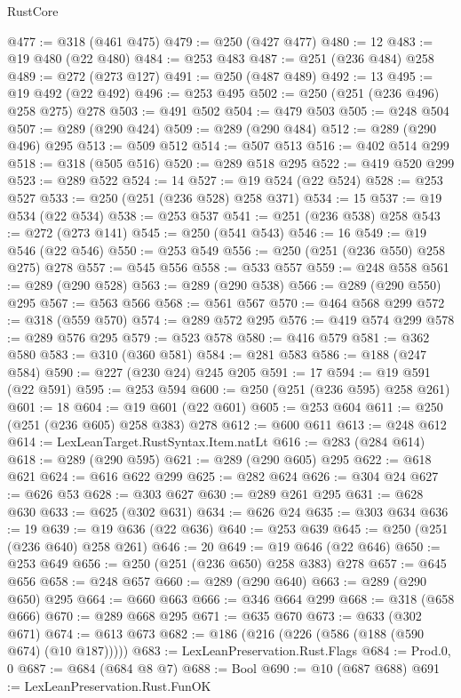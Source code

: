 \begin{lexlean}{RustCore}
\begin{coremodule}
@477 := @318 (@461 @475)
@479 := @250 (@427 @477)
@480 := 12
@483 := @19 @480 (@22 @480)
@484 := @253 @483
@487 := @251 (@236 @484) @258
@489 := @272 (@273 @127)
@491 := @250 (@487 @489)
@492 := 13
@495 := @19 @492 (@22 @492)
@496 := @253 @495
@502 := @250 (@251 (@236 @496) @258 @275) @278
@503 := @491 @502
@504 := @479 @503
@505 := @248 @504
@507 := @289 (@290 @424)
@509 := @289 (@290 @484)
@512 := @289 (@290 @496) @295
@513 := @509 @512
@514 := @507 @513
@516 := @402 @514 @299
@518 := @318 (@505 @516)
@520 := @289 @518 @295
@522 := @419 @520 @299
@523 := @289 @522
@524 := 14
@527 := @19 @524 (@22 @524)
@528 := @253 @527
@533 := @250 (@251 (@236 @528) @258 @371)
@534 := 15
@537 := @19 @534 (@22 @534)
@538 := @253 @537
@541 := @251 (@236 @538) @258
@543 := @272 (@273 @141)
@545 := @250 (@541 @543)
@546 := 16
@549 := @19 @546 (@22 @546)
@550 := @253 @549
@556 := @250 (@251 (@236 @550) @258 @275) @278
@557 := @545 @556
@558 := @533 @557
@559 := @248 @558
@561 := @289 (@290 @528)
@563 := @289 (@290 @538)
@566 := @289 (@290 @550) @295
@567 := @563 @566
@568 := @561 @567
@570 := @464 @568 @299
@572 := @318 (@559 @570)
@574 := @289 @572 @295
@576 := @419 @574 @299
@578 := @289 @576 @295
@579 := @523 @578
@580 := @416 @579
@581 := @362 @580
@583 := @310 (@360 @581)
@584 := @281 @583
@586 := @188 (@247 @584)
@590 := @227 (@230 @24) @245 @205
@591 := 17
@594 := @19 @591 (@22 @591)
@595 := @253 @594
@600 := @250 (@251 (@236 @595) @258 @261)
@601 := 18
@604 := @19 @601 (@22 @601)
@605 := @253 @604
@611 := @250 (@251 (@236 @605) @258 @383) @278
@612 := @600 @611
@613 := @248 @612
@614 := LexLeanTarget.RustSyntax.Item.natLt
@616 := @283 (@284 @614)
@618 := @289 (@290 @595)
@621 := @289 (@290 @605) @295
@622 := @618 @621
@624 := @616 @622 @299
@625 := @282 @624
@626 := @304 @24
@627 := @626 @53
@628 := @303 @627
@630 := @289 @261 @295
@631 := @628 @630
@633 := @625 (@302 @631)
@634 := @626 @24
@635 := @303 @634
@636 := 19
@639 := @19 @636 (@22 @636)
@640 := @253 @639
@645 := @250 (@251 (@236 @640) @258 @261)
@646 := 20
@649 := @19 @646 (@22 @646)
@650 := @253 @649
@656 := @250 (@251 (@236 @650) @258 @383) @278
@657 := @645 @656
@658 := @248 @657
@660 := @289 (@290 @640)
@663 := @289 (@290 @650) @295
@664 := @660 @663
@666 := @346 @664 @299
@668 := @318 (@658 @666)
@670 := @289 @668 @295
@671 := @635 @670
@673 := @633 (@302 @671)
@674 := @613 @673
@682 := @186 (@216 (@226 (@586 (@188 (@590 @674) (@10 @187)))))
@683 := LexLeanPreservation.Rust.Flags
@684 := Prod.{0, 0}
@687 := @684 (@684 @8 @7)
@688 := Bool
@690 := @10 (@687 @688)
@691 := LexLeanPreservation.Rust.FunOK

\end{coremodule}
\end{lexlean}

